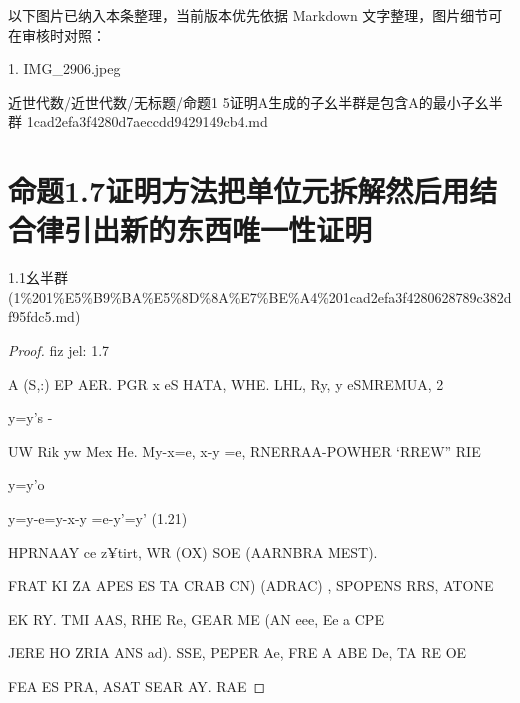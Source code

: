 \begin{note}[关联图片]
以下图片已纳入本条整理，当前版本优先依据 Markdown 文字整理，图片细节可在审核时对照：

1. IMG\_2906.jpeg\\

\end{note}

\begin{note}[来源路径]

近世代数/近世代数/无标题/命题1 5证明A生成的子幺半群是包含A的最小子幺半群 1cad2efa3f4280d7aeccdd9429149cb4.md

\end{note}

\section*{命题1.7证明方法把单位元拆解然后用结合律引出新的东西唯一性证明}

\begin{note}[来源上级主题]

1.1幺半群 (1\%201\%E5\%B9\%BA\%E5\%8D\%8A\%E7\%BE\%A4\%201cad2efa3f4280628789c382df95fdc5.md)

\end{note}

\begin{proof}

fiz jel: 1.7

A (S,:) EP AER. PGR x eS HATA, WHE. LHL, Ry, y eSMREMUA, 2

y=y's                                                                                                        -

UW Rik yw Mex He. My-x=e, x-y =e, RNERRAA-POWHER ‘RREW” RIE

y=y'o

y=y-e=y-x-y =e-y'=y’                     (1.21)

HPRNAAY ce z¥tirt, WR (OX) SOE (AARNBRA MEST).

FRAT KI ZA APES ES TA CRAB CN) (ADRAC) , SPOPENS RRS, ATONE

EK RY. TMI AAS, RHE Re, GEAR ME (AN eee, Ee a CPE

JERE HO ZRIA ANS ad). SSE, PEPER Ae, FRE A ABE De, TA RE OE

FEA ES PRA, ASAT SEAR AY. RAE

\end{proof}

